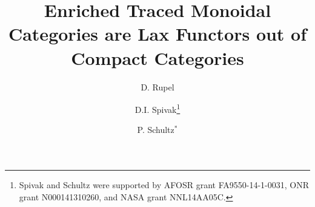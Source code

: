 \documentclass[12pt,oneside,article,draft]{memoir}
\title{Enriched Traced Monoidal Categories are Lax Functors out of Compact Categories}
\author{
D. Rupel 
 \and 
D.I. Spivak\thanks{Spivak and Schultz were supported by AFOSR grant FA9550-14-1-0031, ONR grant N000141310260, and NASA grant NNL14AA05C.}
 \and 
 P. Schultz${}^*$%
 }
\begin{document}
\tightlists
\firmlists

\maketitle
\tableofcontents


\end{document}
